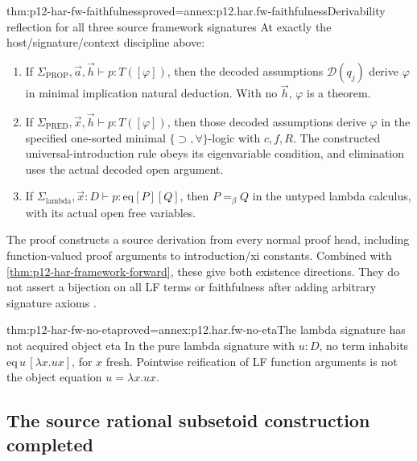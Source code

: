 \begin{hbtheorem}{thm:p12-har-fw-faithfulness}{proved=annex:p12.har.fw-faithfulness}{Derivability reflection for all three source framework signatures}
At exactly the host/signature/context discipline above:
\begin{enumerate}
 \item If \(\Sigma_{\mathrm{PROP}},\vec a,\vec h
 \vdash p:T([\varphi])\), then the decoded assumptions
 \(\mathcal D(q_j)\) derive \(\varphi\) in minimal implication
 natural deduction. With no \(\vec h\), \(\varphi\) is a theorem.
 \item If \(\Sigma_{\mathrm{PRED}},\vec x,\vec h
 \vdash p:T([\varphi])\), then those decoded assumptions derive
 \(\varphi\) in the specified one-sorted minimal
 \(\{\supset,\forall\}\)-logic with \(c,f,R\).
 The constructed universal-introduction rule obeys its eigenvariable
 condition, and elimination uses the actual decoded open argument.
 \item If \(\Sigma_{\mathrm{lambda}},\vec x:D
 \vdash p:\mathrm{eq}[P][Q]\), then \(P=_\beta Q\)
 in the untyped lambda calculus, with its actual open free variables.
\end{enumerate}
The proof constructs a source derivation from every normal proof head,
including function-valued proof arguments to introduction/xi constants.
Combined with \cref{thm:p12-har-framework-forward}, these give both
existence directions. They do not assert a bijection on all LF terms or
faithfulness after adding arbitrary signature axioms
\cite[pp.~1161--1163]{BarendregtGeuvers2001}.
\end{hbtheorem}

\begin{hbcorollary}{thm:p12-har-fw-no-eta}{proved=annex:p12.har.fw-no-eta}{The lambda signature has not acquired object eta}
In the pure lambda signature with \(u:D\), no term inhabits
\(\mathrm{eq}\,u\,[\lambda x.ux]\), for \(x\) fresh.
Pointwise reification of LF function arguments is not the object
equation \(u=\lambda x.ux\).
\end{hbcorollary}

\subsection{The source rational subsetoid construction completed}


